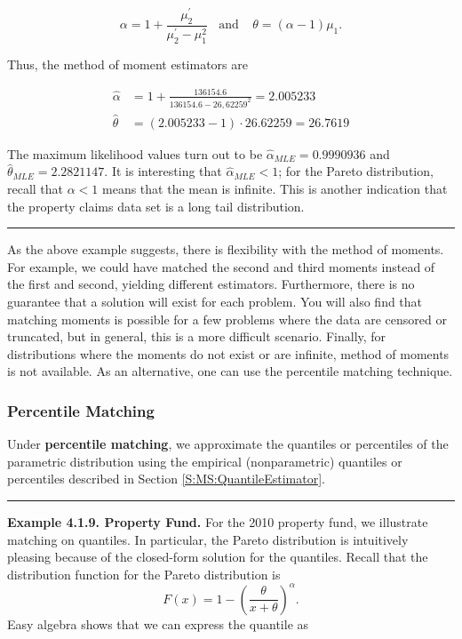 \documentclass[]{book}
\theoremstyle{definition}
\theoremstyle{definition}
\theoremstyle{definition}
\theoremstyle{remark}
\begin{document}
\[\alpha = 1+ \frac{\mu_2^{\prime}}{\mu_2^{\prime}-\mu_1^2} \ \ \ \
\text{and} \ \ \ \ \
 \theta = (\alpha-1)\mu_1.\]

Thus, the method of moment estimators are

\[
\begin{aligned}
\hat{\alpha} &=  1+ \frac{136154.6}{136154.6-26,62259^2} = 2.005233 \\
\hat{\theta} &=  (2.005233-1) \cdot 26.62259 = 26.7619
\end{aligned}
\]

The maximum likelihood values turn out to be
\(\hat{\alpha}_{MLE} = 0.9990936\) and
\(\hat{\theta}_{MLE} = 2.2821147\). It is interesting that
\(\hat{\alpha}_{MLE}<1\); for the Pareto distribution, recall that
\(\alpha <1\) means that the mean is infinite. This is another
indication that the property claims data set is a long tail
distribution.

\begin{center}\rule{0.5\linewidth}{\linethickness}\end{center}

As the above example suggests, there is flexibility with the method of
moments. For example, we could have matched the second and third moments
instead of the first and second, yielding different estimators.
Furthermore, there is no guarantee that a solution will exist for each
problem. You will also find that matching moments is possible for a few
problems where the data are censored or truncated, but in general, this
is a more difficult scenario. Finally, for distributions where the
moments do not exist or are infinite, method of moments is not
available. As an alternative, one can use the percentile matching
technique.

\subsubsection{Percentile Matching}\label{percentile-matching}

Under \textbf{percentile matching}, we approximate the quantiles or
percentiles of the parametric distribution using the empirical
(nonparametric) quantiles or percentiles described in Section
\ref{S:MS:QuantileEstimator}.

\begin{center}\rule{0.5\linewidth}{\linethickness}\end{center}

\textbf{Example 4.1.9. Property Fund.} For the 2010 property fund, we
illustrate matching on quantiles. In particular, the Pareto distribution
is intuitively pleasing because of the closed-form solution for the
quantiles. Recall that the distribution function for the Pareto
distribution is
\[F(x) = 1 - \left(\frac{\theta}{x+\theta}\right)^{\alpha}.\] Easy
algebra shows that we can express the quantile as
\end{document}
